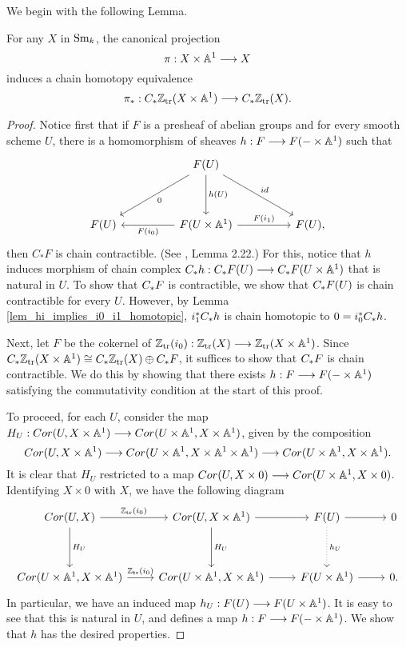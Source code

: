 We begin with the following Lemma.

\begin{lem}
For any $X$ in $\mathrm{Sm}_{k}$, the canonical projection
\[
\pi: X \times \mathbb{A}^1 \longrightarrow X
\]
induces a chain homotopy equivalence
\[
\pi_*: C_{*} \mathbb{Z}_{\mathrm{tr}}(X \times \mathbb{A}^1) \longrightarrow C_{*} \mathbb{Z}_{\mathrm{tr}}(X).
\]
\end{lem}

\begin{proof}
Notice first that if $F$ is a presheaf of abelian groups and for
every smooth scheme $U$, there is a homomorphism of sheaves $h:
F \longrightarrow F(- \times \mathbb{A}^1)$ such that
\begin{equation}\label{eq_contr_cond}
\begin{tikzcd}[row sep=huge, column sep=huge]
{}&
F(U) \arrow{ld}{0} \arrow{d}{h(U)} \arrow{rd}{id} \\
F(U) &
F(U \times \A^1) \arrow{l}{F(i_0)} \arrow{r}{F(i_1)} &
F(U),
\end{tikzcd}
\end{equation}
then $C_*F$ is chain contractible. (See \cite{MVW}, Lemma 2.22.) 
For this, notice that $h$ induces morphism of chain complex 
$C_{*} h : C_{*} F(U) \longrightarrow C_{*} F(U \times \mathbb{A}^1)$ that is 
natural in $U$. To show that $C_{*} F$ is contractible, we show 
that $C_{*} F(U)$ is chain contractible for every $U$. However, 
by Lemma \ref{lem_hi_implies_i0_i1_homotopic}, $i_1^* C_{*} h$ 
is chain homotopic to $0 = i_0^* C_{*} h$.

Next, let $F$ be the cokernel of $\mathbb{Z}_{\mathrm{tr}}(i_0): \mathbb{Z}_{\mathrm{tr}}(X) \longrightarrow \mathbb{Z}_{\mathrm{tr}}(X 
\times \mathbb{A}^1)$. Since $C_{*} \mathbb{Z}_{\mathrm{tr}}(X \times \mathbb{A}^1) \cong C_{*}
\mathbb{Z}_{\mathrm{tr}}(X) \oplus C_{*} F$, it suffices to show that $C_{*} F$
is chain contractible. We do this by showing that there exists
$h: F \longrightarrow F(- \times \mathbb{A}^1)$ satisfying the commutativity condition 
at the start of this proof.

To proceed, for each $U$, consider the map $H_U: Cor(U, X \times 
\mathbb{A}^1) \longrightarrow Cor(U \times \mathbb{A}^1, X \times \mathbb{A}^1)$, given by the 
composition
\[
Cor(U, X \times \mathbb{A}^1) \longrightarrow
Cor(U \times \mathbb{A}^1, X \times \mathbb{A}^1 \times \mathbb{A}^1) \longrightarrow
Cor(U \times \mathbb{A}^1, X \times \mathbb{A}^1).
\]
It is clear that $H_U$ restricted to a map $Cor(U, X \times 0)
\longrightarrow Cor(U \times \mathbb{A}^1, X \times 0)$. Identifying $X \times 0$
with $X$, we have the following diagram
\[
\begin{tikzcd}[row sep=huge]
\Cor(U, X) \arrow{r}{\Ztr(i_0)} \arrow{d}{H_U} &
\Cor(U, X \times \A^1) \arrow{r} \arrow{d}{H_U} &
F(U) \arrow{r} \arrow[dotted]{d}{h_U}&
0 \\
\Cor(U \times \A^1, X \times \A^1) \arrow{r}{\Ztr(i_0)} &
\Cor(U \times \A^1, X \times \A^1) \arrow{r} &
F(U \times \A^1) \arrow{r} &
0.
\end{tikzcd}
\]
In particular, we have an induced map $h_U: F(U) \longrightarrow F(U \times 
\mathbb{A}^1)$. It is easy to see that this is natural in $U$, and defines 
a map $h : F \longrightarrow F( - \times \mathbb{A}^1)$. We show that $h$ has the
desired properties.


\end{proof}
